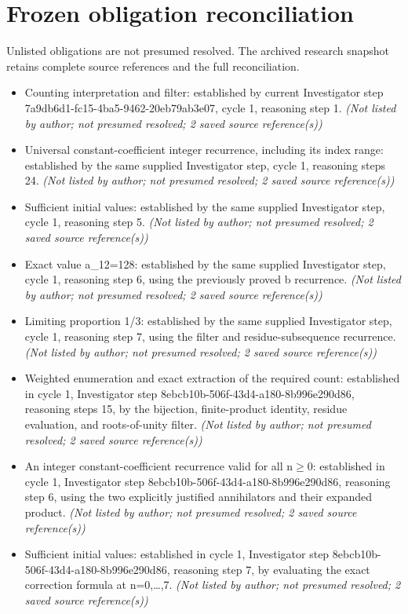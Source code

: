 \documentclass[11pt]{article}
\begin{document}
\section{Frozen obligation reconciliation}
Unlisted obligations are not presumed resolved. The archived research snapshot retains complete source references and the full reconciliation.
\begin{itemize}
\item Counting interpretation and filter: established by current Investigator step 7a9db6d1-fc15-4ba5-9462-20eb79ab3e07, cycle 1, reasoning step 1. \textit{ (Not listed by author; not presumed resolved; 2 saved source reference(s))}
\item Universal constant-coefficient integer recurrence, including its index range: established by the same supplied Investigator step, cycle 1, reasoning steps 2\textendash{}4. \textit{ (Not listed by author; not presumed resolved; 2 saved source reference(s))}
\item Sufficient initial values: established by the same supplied Investigator step, cycle 1, reasoning step 5. \textit{ (Not listed by author; not presumed resolved; 2 saved source reference(s))}
\item Exact value a\_\allowbreak{}12=128: established by the same supplied Investigator step, cycle 1, reasoning step 6, using the previously proved b recurrence. \textit{ (Not listed by author; not presumed resolved; 2 saved source reference(s))}
\item Limiting proportion 1/3: established by the same supplied Investigator step, cycle 1, reasoning step 7, using the filter and residue-subsequence recurrence. \textit{ (Not listed by author; not presumed resolved; 2 saved source reference(s))}
\item Weighted enumeration and exact extraction of the required count: established in cycle 1, Investigator step 8ebcb10b-506f-43d4-a180-8b996e290d86, reasoning steps 1\textendash{}5, by the bijection, finite-product identity, residue evaluation, and roots-of-unity filter. \textit{ (Not listed by author; not presumed resolved; 2 saved source reference(s))}
\item An integer constant-coefficient recurrence valid for all n$\geq$0: established in cycle 1, Investigator step 8ebcb10b-506f-43d4-a180-8b996e290d86, reasoning step 6, using the two explicitly justified annihilators and their expanded product. \textit{ (Not listed by author; not presumed resolved; 2 saved source reference(s))}
\item Sufficient initial values: established in cycle 1, Investigator step 8ebcb10b-506f-43d4-a180-8b996e290d86, reasoning step 7, by evaluating the exact correction formula at n=0,\ldots{},7. \textit{ (Not listed by author; not presumed resolved; 2 saved source reference(s))}

\end{itemize}
\end{document}
